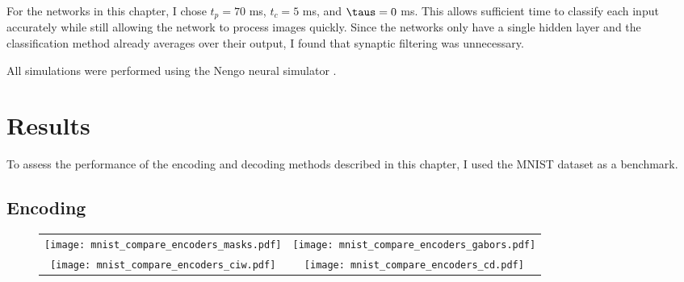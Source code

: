 For the networks in this chapter,
I chose $t_p = 70$ ms, $t_c = 5$ ms, and $\taus = 0$ ms.
This allows sufficient time to classify each input accurately
while still allowing the network to process images quickly.
Since the networks only have a single hidden layer
and the classification method already averages over their output,
I found that synaptic filtering was unnecessary.

All simulations were performed using the Nengo neural simulator \parencite{Bekolay2014}.


\section{Results}

To assess the performance of the encoding and decoding methods
described in this chapter,
I used the MNIST dataset as a benchmark.


\subsection{Encoding}

\begin{figure}
  \centering
  \newcommand{\gwidth}{0.45\columnwidth}
  \begin{tabular}{cc}
    \texttt{[image: mnist\_compare\_encoders\_masks.pdf]} &
    \texttt{[image: mnist\_compare\_encoders\_gabors.pdf]} \\
    \texttt{[image: mnist\_compare\_encoders\_ciw.pdf]} &
    \texttt{[image: mnist\_compare\_encoders\_cd.pdf]} \\
  \end{tabular}
\end{figure}


